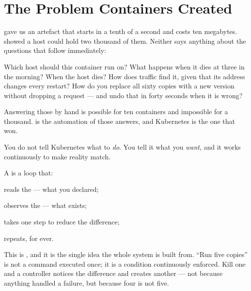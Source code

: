 \section{The Problem Containers Created}

 gave us an artefact that starts in a tenth of a second and costs
ten megabytes.  showed a host could hold two thousand of
them. Neither says anything about the questions that follow immediately:

Which host should this container run on? What happens when it dies at three in
the morning? When the host dies? How does traffic find it, given that its
address changes every restart? How do you replace all sixty copies with a new
version without dropping a request --- and undo that in forty seconds when it
is wrong?

Answering those by hand is possible for ten containers and impossible for a
thousand.  is the automation of those answers, and
Kubernetes is the one that won.

\begin{definitionbox}
You do not tell Kubernetes what to \emph{do}. You tell it what you \emph{want},
and it works continuously to make reality match.

\smallskip
A  is a loop that:
\begin{tight}
  \item reads the  --- what you declared;
  \item observes the  --- what exists;
  \item takes one step to reduce the difference;
  \item repeats, for ever.
\end{tight}

\smallskip
This is , and it is the single idea the whole system is
built from. ``Run five copies'' is not a command executed once; it is a
condition continuously enforced. Kill one and a controller notices the
difference and creates another --- not because anything handled a failure, but
because four is not five.
\end{definitionbox}

